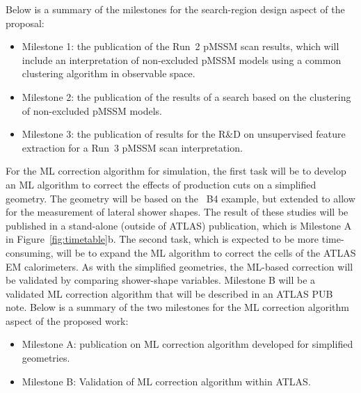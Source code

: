 \documentclass[letter, USenglish, 11pt, subfigure]{article}
\begin{document}
Below is a summary of the milestones for the search-region design aspect of the proposal:
\begin{itemize}
\item Milestone 1: the publication of the Run~2 pMSSM scan results, which will include an interpretation of non-excluded pMSSM models using a common clustering algorithm in observable space.
\item Milestone 2: the publication of the results of a search based on the clustering of non-excluded pMSSM models.
\item Milestone 3: the publication of results for the R\&D on unsupervised feature extraction for a Run~3 pMSSM scan interpretation.
\end{itemize}

For the ML correction algorithm for simulation, the first task will be to develop an ML algorithm to correct the effects of production cuts on a simplified geometry. The geometry will be based on the \GEANT\ B4 example, but extended to allow for the measurement of lateral shower shapes. The result of these studies will be published in a stand-alone (outside of ATLAS) publication, which is Milestone A in Figure~\ref{fig:timetable}b. The second task, which is expected to be more time-consuming, will be to expand the ML algorithm to correct the cells of the ATLAS EM calorimeters. As with the simplified geometries, the ML-based correction will be validated by comparing shower-shape variables. Milestone B will be a validated ML correction algorithm that will be described in an ATLAS PUB note.
Below is a summary of the two milestones for the ML correction algorithm aspect of the proposed work:
\begin{itemize}
\item Milestone A: publication on ML correction algorithm developed for simplified geometries.
\item Milestone B: Validation of ML correction algorithm within ATLAS.
\end{itemize}
\end{document}
